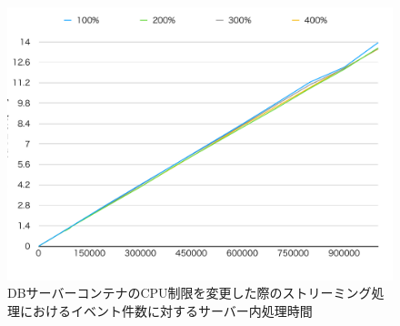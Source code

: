 \documentclass[../../../../../main]{subfiles}
\begin{document}
    \begin{figure}[H]
        \centering
        \includegraphics[width=12cm]{graph}
        \caption{DBサーバーコンテナのCPU制限を変更した際のストリーミング処理におけるイベント件数に対するサーバー内処理時間}
        \label{fig:stream-change-db-cpu-limit-server-time-app_4_8192-db_1024}
    \end{figure}
\end{document}
